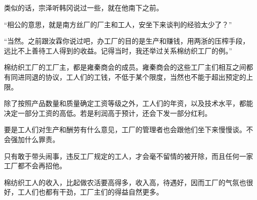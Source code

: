类似的话，宗泽听韩冈说过一些，就在他南下之前。

“相公的意思，就是南方丝厂的厂主和工人，安坐下来谈判的经验太少了？”

“当然。之前跟汝霖你说过吧，办工厂的目的是生产和赚钱，用两浙的压榨手段，远比不上善待工人得到的收益。记得当时，我还举过关系棉纺织工厂的例。”

棉纺织工厂的工厂主，都是雍秦商会的成员。雍秦商会的这些工厂主们相互之间都有同进同退的协议，工人们的工钱，不低于某个限度，当然也不能于超出预定的上限。

除了按照产品数量和质量确定工资等级之外，工人们的年资，以及技术水平，都能决定一部分工资的高低。若是利润高于预计，还会下发一部分红利。

要是工人们对生产和酬劳有什么意见，工厂的管理者也会跟他们坐下来慢慢谈。不会强加什么罪责。

只有敢于带头闹事，违反工厂规定的工人，才会毫不留情的被开除，而且任何一家工厂都不会再招他。

棉纺织工人的收入，比起做农活要高得多，收入高，待遇好，因而工厂的气氛也很好，工人们也都有干劲，工厂主们的得益自然更多。
